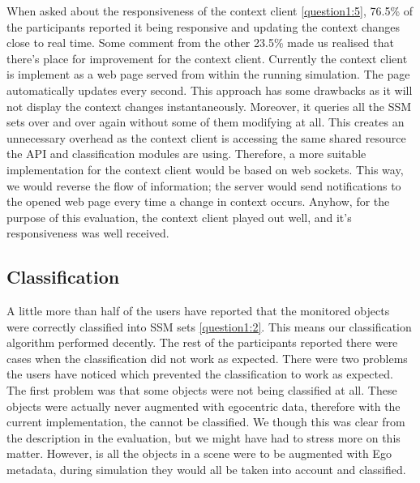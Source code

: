When asked about the responsiveness of the context client \ref{question1:5}, 76.5\% of the participants reported it being responsive and updating the context changes close to real time. Some comment from the other 23.5\% made us realised that there's place for improvement for the context client. Currently the context client is implement as a web page served from within the running simulation. The page automatically updates every second. This approach has some drawbacks as it will not display the context changes instantaneously. Moreover, it queries all the SSM sets over and over again without some of them modifying at all. This creates an unnecessary overhead as the context client is accessing the same shared resource the API and classification modules are using. Therefore, a more suitable implementation for the context client would be based on web sockets. This way, we would reverse the flow of information; the server would send notifications to the opened web page every time a change in context occurs. Anyhow, for the purpose of this evaluation, the context client played out well, and it's responsiveness was well received.

\subsection{Classification} %
\label{sec:eval_classification}
A little more than half of the users have reported that the monitored objects were correctly classified into SSM sets \ref{question1:2}. This means our classification algorithm performed decently. The rest of the participants reported there were cases when the classification did not work as expected. There were two problems the users have noticed which prevented the classification to work as expected.\\

The first problem was that some objects were not being classified at all. These objects were actually never augmented with egocentric data, therefore with the current implementation, the cannot be classified. We though this was clear from the description in the evaluation, but we might have had to stress more on this matter. However, is all the objects in a scene were to be augmented with Ego metadata, during simulation they would all be taken into account and classified.\\

